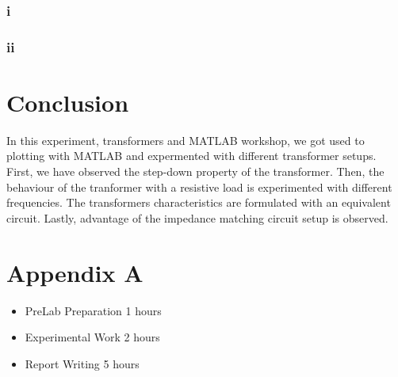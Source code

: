 \documentclass[letterpaper,12pt]{article}
\begin{document}
\subsubsection{i}
\subsubsection{ii}


\section{Conclusion}
In this experiment, transformers and MATLAB workshop, we got used to plotting with MATLAB and expermented with different transformer setups. First, we have observed the step-down property of the transformer. Then, the behaviour of the tranformer with a resistive load is experimented with different frequencies. The transformers characteristics are formulated with an equivalent circuit. Lastly, advantage of the impedance matching circuit setup is observed.
\section*{Appendix A}
\begin{itemize}
    \item PreLab Preparation 1 hours
    \item Experimental Work 2  hours
    \item Report Writing 5 hours
\end{itemize}
\end{document}
